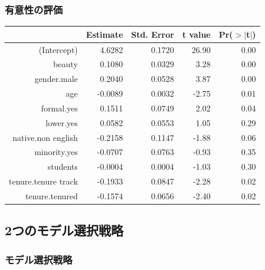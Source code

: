 
\begin{frame}
\frametitle{有意性の評価}


{\scriptsize
\begin{center}
\begin{tabular}{rrrrr}
  \hline
 & Estimate & Std. Error & t value & Pr($>$$|$t$|$) \\
  \hline
(Intercept) & 4.6282 & 0.1720 & 26.90 & 0.00 \\
  beauty & 0.1080 & 0.0329 & 3.28 & 0.00 \\
  gender.male & 0.2040 & 0.0528 & 3.87 & 0.00 \\
  age & -0.0089 & 0.0032 & -2.75 & 0.01 \\
  formal.yes & 0.1511 & 0.0749 & 2.02 & 0.04 \\
  \rowcolor{oiB!50}
  lower.yes & 0.0582 & 0.0553 & 1.05 & 0.29 \\
    \rowcolor{oiB!50}
  native.non english & -0.2158 & 0.1147 & -1.88 & 0.06 \\
    \rowcolor{oiB!50}
  minority.yes & -0.0707 & 0.0763 & -0.93 & 0.35 \\
    \rowcolor{oiB!50}
  students & -0.0004 & 0.0004 & -1.03 & 0.30 \\
  tenure.tenure track & -0.1933 & 0.0847 & -2.28 & 0.02 \\
  tenure.tenured & -0.1574 & 0.0656 & -2.40 & 0.02 \\
   \hline
\end{tabular}
\end{center}
}

\end{frame}


\subsection{2つのモデル選択戦略}


\begin{frame}
\frametitle{モデル選択戦略}


\end{frame}


